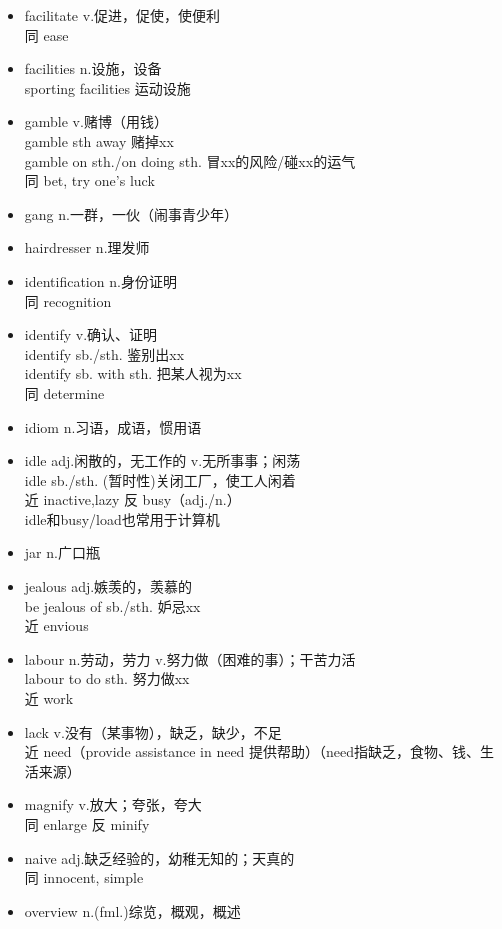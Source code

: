 \documentclass[11pt,a4paper,UTF8,titlepage]{ctexart} %
\begin{document}
\begin{multicols}{2}
\begin{itemize}
        \item facilitate v.促进，促使，使便利\\同 ease
        \item facilities n.设施，设备\\sporting facilities 运动设施
        \item gamble v.赌博（用钱）\\gamble sth away 赌掉xx\\gamble on sth./on doing sth. 冒xx的风险/碰xx的运气\\同 bet, try one's luck
        \item gang n.一群，一伙（闹事青少年）
        \item hairdresser n.理发师
        \item identification n.身份证明\\同 recognition
        \item identify v.确认、证明\\identify sb./sth. 鉴别出xx\\identify sb. with sth. 把某人视为xx\\同 determine
        \item idiom n.习语，成语，惯用语
        \item idle adj.闲散的，无工作的 v.无所事事；闲荡\\idle sb./sth. (暂时性)关闭工厂，使工人闲着\\近 inactive,lazy 反 busy（adj./n.）\\idle和busy/load也常用于计算机
        \item jar n.广口瓶
        \item jealous adj.嫉羡的，羡慕的\\be jealous of sb./sth. 妒忌xx\\近 envious
        \item labour n.劳动，劳力 v.努力做（困难的事）；干苦力活\\labour to do sth. 努力做xx\\近 work
        \item lack v.没有（某事物），缺乏，缺少，不足\\近 need（provide assistance in need 提供帮助）（need指缺乏，食物、钱、生活来源）
        \item magnify v.放大；夸张，夸大\\同 enlarge 反 minify
        \item naive adj.缺乏经验的，幼稚无知的；天真的\\同 innocent, simple
        \item overview n.(fml.)综览，概观，概述

\end{itemize}
\end{multicols}
\end{document}
